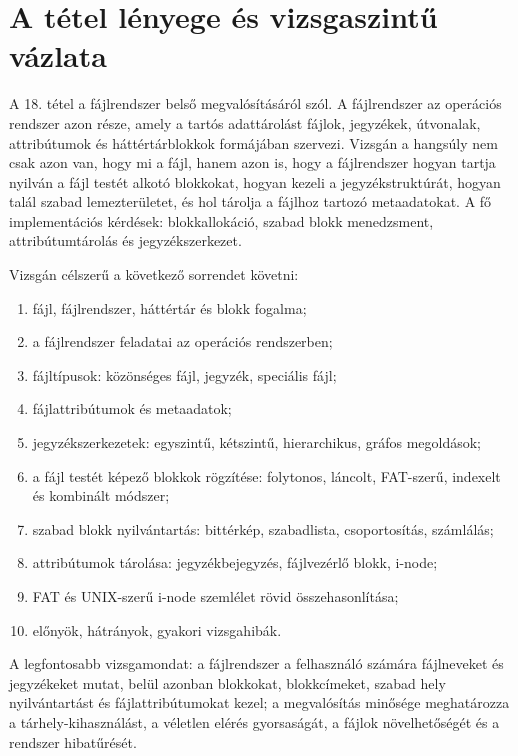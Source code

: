 \section{A tétel lényege és vizsgaszintű vázlata}

\begin{summarybox}
A 18. tétel a fájlrendszer belső megvalósításáról szól. A fájlrendszer az operációs rendszer azon része, amely a tartós adattárolást fájlok, jegyzékek, útvonalak, attribútumok és háttértárblokkok formájában szervezi. Vizsgán a hangsúly nem csak azon van, hogy mi a fájl, hanem azon is, hogy a fájlrendszer hogyan tartja nyilván a fájl testét alkotó blokkokat, hogyan kezeli a jegyzékstruktúrát, hogyan talál szabad lemezterületet, és hol tárolja a fájlhoz tartozó metaadatokat. A fő implementációs kérdések: blokkallokáció, szabad blokk menedzsment, attribútumtárolás és jegyzékszerkezet.
\end{summarybox}

Vizsgán célszerű a következő sorrendet követni:

\begin{enumerate}
  \item fájl, fájlrendszer, háttértár és blokk fogalma;
  \item a fájlrendszer feladatai az operációs rendszerben;
  \item fájltípusok: közönséges fájl, jegyzék, speciális fájl;
  \item fájlattribútumok és metaadatok;
  \item jegyzékszerkezetek: egyszintű, kétszintű, hierarchikus, gráfos megoldások;
  \item a fájl testét képező blokkok rögzítése: folytonos, láncolt, FAT-szerű, indexelt és kombinált módszer;
  \item szabad blokk nyilvántartás: bittérkép, szabadlista, csoportosítás, számlálás;
  \item attribútumok tárolása: jegyzékbejegyzés, fájlvezérlő blokk, i-node;
  \item FAT és UNIX-szerű i-node szemlélet rövid összehasonlítása;
  \item előnyök, hátrányok, gyakori vizsgahibák.
\end{enumerate}

A legfontosabb vizsgamondat: a fájlrendszer a felhasználó számára fájlneveket és jegyzékeket mutat, belül azonban blokkokat, blokkcímeket, szabad hely nyilvántartást és fájlattribútumokat kezel; a megvalósítás minősége meghatározza a tárhely-kihasználást, a véletlen elérés gyorsaságát, a fájlok növelhetőségét és a rendszer hibatűrését.

